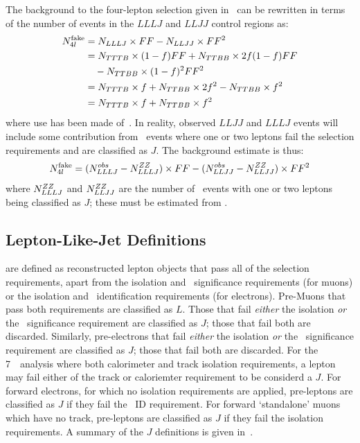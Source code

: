 The background to the four-lepton selection given in~ can 
be rewritten in terms of the number of events in the $LLLJ$ and $LLJJ$ control
regions as:
\begin{align}
N_{4l}^{\rm fake} &= N_{LLLJ} \times FF - N_{LLJJ} \times FF^{2} \\
 &= N_{TTTB} \times (1-f) FF + N_{TTBB} \times 2f (1 - f) FF \\
 &\quad - N_{TTBB} \times (1-f)^{2} FF^{2} \\
 &=  N_{TTTB} \times f + N_{TTBB} \times 2 f^{2} - N_{TTBB} \times f^{2} \\
 &= N_{TTTB} \times f + N_{TTBB} \times f^{2} 
\end{align}
where use has been made of~. In reality, observed
$LLJJ$ and $LLLJ$ events will include some contribution from \ZZllll\ events where
one or two leptons fail the selection requirements and are classified as $J$.
The background estimate is thus:
\begin{equation}
N_{4l}^{\rm fake} = (N^{obs}_{LLLJ} - N^{ZZ}_{LLLJ}) \times FF -
(N^{obs}_{LLJJ} - N^{ZZ}_{LLJJ})\times FF^{2} 
\end{equation}
where $N^{ZZ}_{LLLJ}$ and $N^{ZZ}_{LLJJ}$ are the number of \ZZ\ events with
one or two leptons being classified as $J$; these must be estimated from \mc.

\subsection{Lepton-Like-Jet Definitions}

 are defined as reconstructed lepton objects that pass all of
the selection requirements, apart from the isolation and \dzero\ significance
requirements (for muons) or the isolation and \loosePP\ identification
requirements (for electrons). Pre-Muons that pass both requirements are
classified as $L$. Those that fail {\it either} the isolation {\it or} the
\dzero\ significance requirement are classified as $J$; those that fail both are
discarded. Similarly, pre-electrons that fail {\it either} the isolation {\it or} the
\loosePP\ significance requirement are classified as $J$; those that fail both are
discarded. For the 7~\tev\ analysis where both calorimeter and track isolation
requirements, a lepton may fail either of the track or caloriemter requirement
to be considerd a $J$. For forward electrons, for which no isolation
requirements are applied, pre-leptons are classified as $J$
if they fail the \tight\ ID requirement. For forward `standalone' muons which have
no track, pre-leptons are classified as $J$ if they fail the isolation
requirements. A summary of the $J$ definitions is
given in~.


